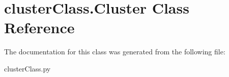 \hypertarget{classclusterClass_1_1Cluster}{\section{cluster\-Class.\-Cluster Class Reference}
\label{classclusterClass_1_1Cluster}
}


The documentation for this class was generated from the following file\-:\begin{DoxyCompactItemize}
\item 
cluster\-Class.\-py\end{DoxyCompactItemize}
